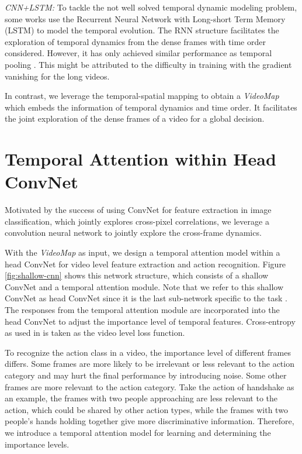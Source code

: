 \documentclass[english, 10pt, twocolumn, twoside]{IEEEtran}
\begin{document}
\emph{CNN+LSTM:} To tackle the not well solved temporal dynamic modeling problem, some works \cite{yue2015beyond,donahue2015long,sharma2015actionattention,li2016videolstm} use the Recurrent Neural Network with Long-short Term Memory (LSTM) to model the temporal evolution. The RNN structure facilitates the exploration of temporal dynamics from the dense frames with time order considered. However, it has only achieved similar performance as temporal pooling \cite{yue2015beyond}. This might be attributed to the difficulty in training with the gradient vanishing for the long videos.

In contrast, we leverage the temporal-spatial mapping to obtain a \emph{VideoMap} which embeds the information of temporal dynamics and time order. It facilitates the joint exploration of the dense frames of a video for a global decision.



\section{Temporal Attention within Head ConvNet}
\label{ssecAttention}

Motivated by the success of using ConvNet for feature extraction in image classification, which jointly explores cross-pixel correlations, we leverage a convolution neural network to jointly explore the cross-frame dynamics.


With the \emph{VideoMap} as input, we design a temporal attention model within a head ConvNet for video level feature extraction and action recognition. Figure \ref{fig:shallow-cnn} shows this network structure, which consists of a shallow ConvNet and a temporal attention module. Note that we refer to this shallow ConvNet as head ConvNet since it is the last sub-network specific to the task \cite{he2017mask}. The responses from the temporal attention module are incorporated into the head ConvNet to adjust the importance level of temporal features. Cross-entropy as used in \cite{wang2016temporal} is taken as the video level loss function.

To recognize the action class in a video, the importance level of different frames differs. Some frames are more likely to be irrelevant or less relevant to the action category and may hurt the final performance by introducing noise. Some other frames are more relevant to the action category. Take the action of handshake as an example, the frames with two people approaching are less relevant to the action, which could be shared by other action types, while the frames with two people's hands holding together give more discriminative information. Therefore, we introduce a temporal attention model for learning and determining the importance levels.
\end{document}
